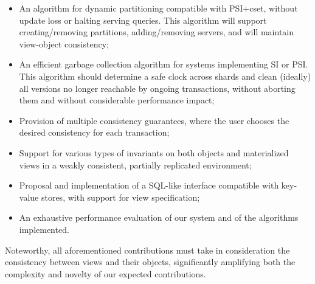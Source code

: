 \begin{itemize}
	\item An algorithm for dynamic partitioning compatible with PSI+cset, without update loss or halting serving queries. This algorithm will support creating/removing partitions, adding/removing servers, and will maintain view-object consistency;
	\item An efficient garbage collection algorithm for systems implementing SI or PSI. This algorithm should determine a safe clock across shards and clean (ideally) all versions no longer reachable by ongoing transactions, without aborting them and without considerable performance impact;
	\item Provision of multiple consistency guarantees, where the user chooses the desired consistency for each transaction;
	\item Support for various types of invariants on both objects and materialized views in a weakly consistent, partially replicated environment;
	\item Proposal and implementation of a SQL-like interface compatible with key-value stores, with support for view specification;
	\item An exhaustive performance evaluation of our system and of the algorithms implemented.
\end{itemize}

Noteworthy, all aforementioned contributions must take in consideration the consistency between views and their objects, significantly amplifying both the complexity and novelty of our expected contributions.



